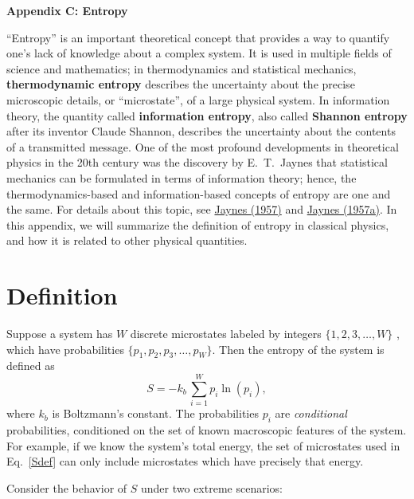 \documentclass[pra,12pt]{revtex4}
\begin{document}
\begin{center}
{\large \textbf{Appendix C: Entropy}}
\end{center}

``Entropy'' is an important theoretical concept that provides a way to
quantify one's lack of knowledge about a complex system.  It is used
in multiple fields of science and mathematics; in thermodynamics and
statistical mechanics, \textbf{thermodynamic entropy} describes the
uncertainty about the precise microscopic details, or ``microstate'',
of a large physical system.  In information theory, the quantity
called \textbf{information entropy}, also called \textbf{Shannon
  entropy} after its inventor Claude Shannon, describes the
uncertainty about the contents of a transmitted message.  One of the
most profound developments in theoretical physics in the 20th century
was the discovery by E.~T.~Jaynes that statistical mechanics can be
formulated in terms of information theory; hence, the
thermodynamics-based and information-based concepts of entropy are one
and the same.  For details about this topic, see
\hyperref[cite:jaynes]{Jaynes (1957)} and
\hyperref[cite:jaynes2]{Jaynes (1957a)}.  In this appendix, we will
summarize the definition of entropy in classical physics, and how it
is related to other physical quantities.

\section{Definition}

Suppose a system has $W$ discrete microstates labeled by integers
$\{1,2,3,\dots, W\}$ , which have probabilities $\{p_1, p_2, p_3,
\dots, p_W\}$.  Then the entropy of the system is defined as
\begin{equation}
  S = - k_b \, \sum_{i=1}^W p_i \ln(p_i),
  \label{Sdef}
\end{equation}
where $k_b$ is Boltzmann's constant.  The probabilities $p_i$ are
\textit{conditional} probabilities, conditioned on the set of known
macroscopic features of the system.  For example, if we know the
system's total energy, the set of microstates used in Eq.~\eqref{Sdef}
can only include microstates which have precisely that energy.

Consider the behavior of $S$ under two extreme
scenarios:
\end{document}
